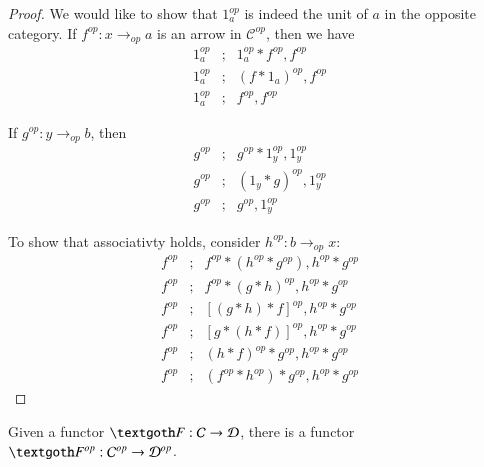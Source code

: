 \documentclass [12pt]{book}
\begin{document}
\begin{proof}We would like to show that $1_a^{op}$ is indeed the unit of $a$ in the opposite category. If $f^{op}:x\rightarrow_{op}a$ is an arrow in $\mathcal C^{op}$, then we have\begin{eqnarray}\nonumber1^{op}_a&;&1^{op}_a*f^{op},f^{op}\\\nonumber
1^{op}_a&;&(f*1_a)^{op},f^{op}\\\nonumber
1^{op}_a&;&f^{op},f^{op}\end{eqnarray}

If $g^{op}:y\rightarrow_{op}b$, then\begin{eqnarray}\nonumber g^{op}&;&g^{op}*1_y^{op},1_y^{op}\\\nonumber
g^{op}&;&(1_y*g)^{op},1_y^{op}\\\nonumber
g^{op}&;&g^{op},1_y^{op}\end{eqnarray}

To show that associativty holds, consider $h^{op}:b\rightarrow_{op}x$:\begin{eqnarray}\nonumber f^{op}&;&f^{op}*(h^{op}*g^{op}),h^{op}*g^{op}\\\nonumber f^{op}&;&f^{op}*(g*h)^{op},h^{op}*g^{op}\\\nonumber f^{op}&;&[(g*h)*f]^{op},h^{op}*g^{op}\\\nonumber f^{op}&;&[g*(h*f)]^{op},h^{op}*g^{op}\\\nonumber f^{op}&;&(h*f)^{op}*g^{op},h^{op}*g^{op}\\\nonumber f^{op}&;&(f^{op}*h^{op})*g^{op},h^{op}*g^{op}\end{eqnarray}\end{proof}

\begin{lemma op func 2}Given a functor $\textgoth F:\mathcal C\rightarrow\mathcal D$, there is a functor $\textgoth F^{op}:\mathcal C^{op}\rightarrow\mathcal D^{op}$.\end{lemma op func 2}
\end{document}

